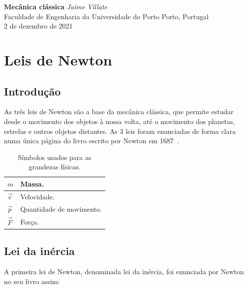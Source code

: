 \documentclass[a4paper,12pt,twosided]{report}
\begin{document}
\begin{titlepage}
\begin{center}
\vspace*{4cm}
{\bfseries\huge Mecânica clássica}
\vfill
{\slshape\Large Jaime Villate}\\
{\large Faculdade de Engenharia da Universidade do Porto}
\vfill
Porto, Portugal\\
2 de dezembro de 2021
\vfill
\end{center}
\end{titlepage}

\tableofcontents
\listoffigures
\listoftables

\chapter{Leis de Newton}

\section{Introdução}

As três leis de Newton são a base da mecânica clássica, que permite
estudar desde o movimento dos objetos à nossa volta, até o movimento
dos planetas, estrelas e outros objetos distantes.  As 3 leis foram
enunciadas de forma clara numa única página do livro escrito por
Newton em 1687~\cite{Newton}.

\begin{table}
  \centering
  \begin{tabular}{|l|l|}
    \hline
    $m$ & Massa.\\
    \hline
    $\vec{v}$ & Velocidade.\\
    \hline
    $\vec{p}$ & Quantidade de movimento.\\
    \hline
    $\vec{F}$ & Força.\\
    \hline
  \end{tabular}
  \caption[Símbolos]{Símbolos usados para as grandezas físicas.}
  \label{tab:simbolos}
\end{table}
\section{Lei da inércia}

A primeira lei de Newton, denominada lei da inércia, foi enunciada por
Newton no seu livro assim:
\end{document}
